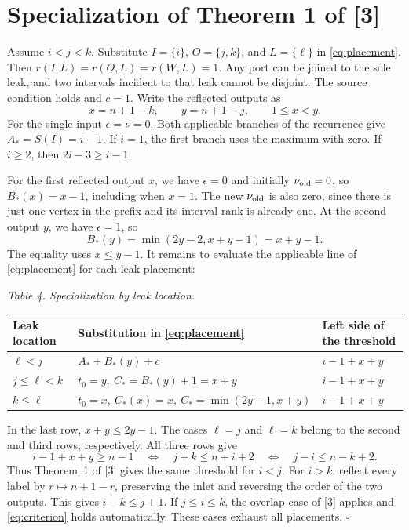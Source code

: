\documentclass[11pt,a4paper]{article}
\newcommand{\sect}[1]{\section{#1}}
\begin{document}
\sect{Specialization of Theorem 1 of [3]}
Assume \(i<j<k\). Substitute \(I=\{i\}\), \(O=\{j,k\}\), and \(L=\{\ell\}\) in \eqref{eq:placement}. Then \(r(I,L)=r(O,L)=r(W,L)=1\). Any port can be joined to the sole leak, and two intervals incident to that leak cannot be disjoint. The source condition holds and \(c=1\). Write the reflected outputs as
\[
                     x=n+1-k,\qquad y=n+1-j,\qquad 1\le x<y .
\]
For the single input \(\epsilon=\nu=0\). Both applicable branches of the recurrence give \(A_*=S(I)=i-1\). If \(i=1\), the first branch uses the maximum with zero. If \(i\ge2\), then \(2i-3\ge i-1\).

For the first reflected output \(x\), we have \(\epsilon=0\) and initially \(\nu_{\rm old}=0\), so \(B_*(x)=x-1\), including when \(x=1\). The new \(\nu_{\rm old}\) is also zero, since there is just one vertex in the prefix and its interval rank is already one. At the second output \(y\), we have \(\epsilon=1\), so
\[
                  B_*(y)=\min(2y-2,x+y-1)=x+y-1 .
\]
The equality uses \(x\le y-1\). It remains to evaluate the applicable line of \eqref{eq:placement} for each leak placement:
\begin{center}
\begin{minipage}{\linewidth}\centering
{\small\itshape Table 4. Specialization by leak location.\par}\smallskip
\begin{tabular}{lll}
\toprule
Leak location & Substitution in \eqref{eq:placement} & Left side of the threshold\\
\midrule
\(\ell<j\) & \(A_*+B_*(y)+c\) & \(i-1+x+y\)\\
\(j\le\ell<k\) & \(t_0=y,\ C_*=B_*(y)+1=x+y\) & \(i-1+x+y\)\\
\(k\le\ell\) & \(t_0=x,\ C_*(x)=x,\ C_*=\min(2y-1,x+y)\) & \(i-1+x+y\)\\
\bottomrule
\end{tabular}
\end{minipage}
\end{center}
In the last row, \(x+y\le2y-1\). The cases \(\ell=j\) and \(\ell=k\) belong to the second and third rows, respectively. All three rows give
\[
           i-1+x+y\ge n-1
           \quad\Longleftrightarrow\quad j+k\le n+i+2
           \quad\Longleftrightarrow\quad j-i\le n-k+2 .
\]
Thus Theorem~1 of [3] gives the same threshold for \(i<j\). For \(i>k\), reflect every label by \(r\mapsto n+1-r\), preserving the inlet and reversing the order of the two outputs. This gives \(i-k\le j+1\). If \(j\le i\le k\), the overlap case of [3] applies and \eqref{eq:criterion} holds automatically. These cases exhaust all placements. \(\square\)
\end{document}
